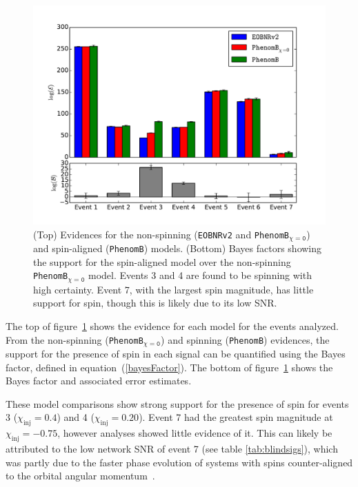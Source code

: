 \documentclass[12pt]{iopart}
\newcommand{\eob}{\texttt{EOBNRv2}\xspace}
\newcommand{\imr}{\texttt{PhenomB}\xspace}
\newcommand{\imrns}{\texttt{PhenomB$_\mathtt{\chi=0}$}\xspace}
\begin{document}
\begin{figure}[t]
  \includegraphics[scale=.6]{figure9}
  \caption{\label{fig:PE_modelComp} (Top) Evidences for the non-spinning (\eob
     and \imrns) and spin-aligned (\imr) models. (Bottom) Bayes factors showing
     the support for the spin-aligned model over the non-spinning \imrns model.
     Events 3 and 4 are found to be spinning with high certainty.  Event 7, with
     the largest spin magnitude, has little support for spin, though this 
     is likely due to its low SNR.}
\end{figure}

The top of figure~\ref{fig:PE_modelComp} shows the evidence for each model for
the events analyzed.  From the non-spinning (\imrns) and spinning (\imr)
evidences, the support for the presence of spin in each signal can be
quantified using the Bayes factor, defined in equation~(\ref{bayesFactor}).  
The bottom of figure~\ref{fig:PE_modelComp} shows the Bayes factor and 
associated error estimates.

These model comparisons show strong support for the presence of spin for events
3 ($\chi_\text{inj}=0.4$) and 4 ($\chi_\text{inj}=0.20$).  Event 7 had the
greatest spin magnitude at $\chi_\text{inj}=-0.75$, however analyses showed
little evidence of it.  This can likely be attributed to the low network SNR of
event 7 (see table \ref{tab:blindsigs}), which was partly due to the faster
phase evolution of systems with spins counter-aligned to the orbital angular
momentum~\cite{Campanelli:2006uy}.
\end{document}
